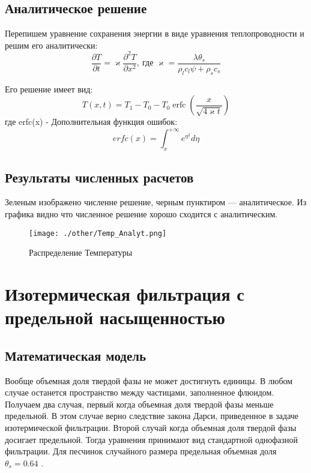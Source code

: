 \documentclass[12pt,a4paper]{article}
\newcommand{\pd}[2]{\frac{\partial #1}{\partial #2}}
\begin{document}
\subsection{Аналитическое решение}
Перепишем уравнение сохранения энергии в виде уравнения теплопроводности и решим его аналитически:
\begin{equation}
\pd{T}{t} = \varkappa\pd{^2 T}{x^2},\ \text{где } \varkappa = \frac{\lambda \theta_s}{\rho_l c_l \psi + \rho_s c_s}
\end{equation}

Его решение имеет вид:
\begin{equation}
T(x,t) = T_1-T_0 - T_0 \operatorname{erfc} \left(\frac{x}{\sqrt{4\varkappa t}}\right)	
\end{equation}
где erfc(x) - Дополнительная функция ошибок:
$$
erfc(x) = \int_{x}^{+\infty}e^{\eta^2}d\eta
$$
\subsection{Результаты численных расчетов}
Зеленым изображено численне решение, черным пунктиром --- аналитическое. Из графика видно что численное решение хорошо сходится с аналитическим.
\begin{figure}[h!]
\begin{center}
\texttt{[image: ./other/Temp\_Analyt.png]}
\caption{Распределение Температуры}
\end{center}
\end{figure}
\newpage
\section{Изотермическая фильтрация с предельной насыщенностью}
\subsection{Математическая модель}
Вообще объемная доля твердой фазы не может достигнуть единицы. В любом случае останется пространство между частицами, заполненное флюидом. Получаем два случая, первый когда объемная доля твердой фазы меньше предельной. В этом случае верно следствие закона Дарси, приведенное в задаче изотермической фильтрации. Второй случай когда объемная доля твердой фазы досигает предельной. Тогда уравнения принимают вид стандартной однофазной фильтрации. Для песчинок случайного размера предельная объемная доля $\theta_s = 0.64 $ \cite{Dobr_phys02}.
\end{document}
